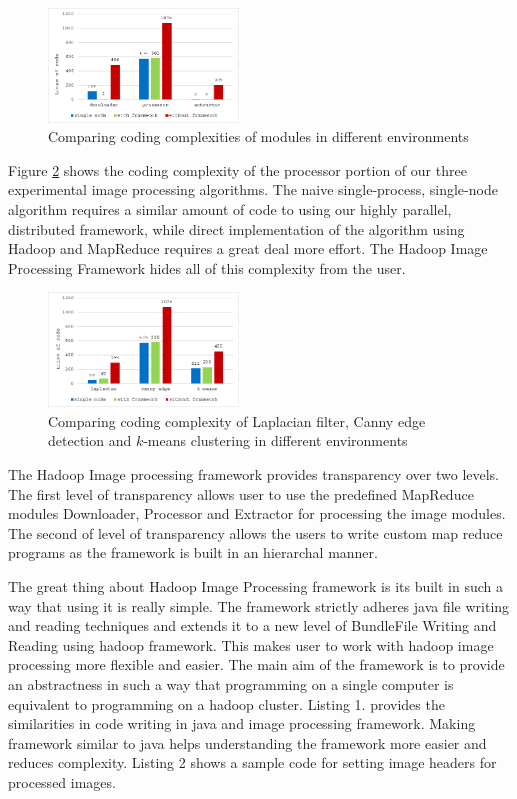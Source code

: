 \documentclass[conference]{IEEEtran}
\begin{document}
\begin{figure}[h]
  \centering
  \includegraphics[width=0.45\textwidth]{module-chart2}
  \caption{Comparing coding complexities of modules in different
    environments}
  \label{fig:module-chart}
\end{figure}

Figure \ref{fig:comp-chart} shows the coding complexity of the
processor portion of our three experimental image processing
algorithms.  The naive single-process, single-node algorithm requires
a similar amount of code to using our highly parallel, distributed
framework, while direct implementation of the algorithm using Hadoop
and MapReduce requires a great deal more effort.  The Hadoop Image
Processing Framework hides all of this complexity from the user.

\begin{figure}[h]
  \centering
  \includegraphics[width=0.45\textwidth]{comp-chart}
  \caption{Comparing coding complexity of Laplacian filter,
    Canny edge detection and $k$-means clustering in different
    environments}
  \label{fig:comp-chart}
\end{figure}

The Hadoop Image processing framework provides transparency over two levels. The first level of transparency allows user to use the predefined MapReduce modules Downloader, Processor and Extractor for processing the image modules. The second of level of transparency allows the users to write custom map reduce programs as the framework is built in an hierarchal manner.

The great thing about Hadoop Image Processing framework is its built in such a way that using it is really simple. The framework strictly adheres java file writing and reading techniques and extends it to a new level of BundleFile Writing and Reading using hadoop framework. This makes user to work with hadoop image processing more flexible and easier. The main aim of the framework is to provide an abstractness in such a way that programming on a single computer is equivalent to programming on a hadoop cluster.  Listing 1. provides the similarities in code writing in java and image processing framework. Making framework similar to java helps understanding the framework more easier and reduces complexity. Listing 2 shows a sample code for setting image headers for processed images.
\end{document}
